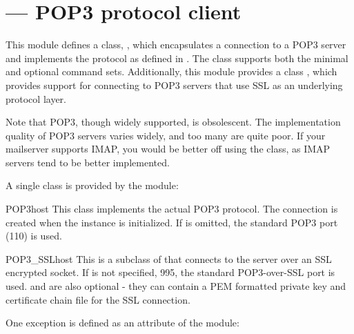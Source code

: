 \section{ ---
         POP3 protocol client}




This module defines a class, , which encapsulates a
connection to a POP3 server and implements the protocol as defined in
.  The  class supports both the minimal and
optional command sets. Additionally, this module provides a class
, which provides support for connecting to POP3
servers that use SSL as an underlying protocol layer.


Note that POP3, though widely supported, is obsolescent.  The
implementation quality of POP3 servers varies widely, and too many are
quite poor. If your mailserver supports IMAP, you would be better off
using the  class, as IMAP
servers tend to be better implemented.

A single class is provided by the  module:

\begin{classdesc}{POP3}{host}
This class implements the actual POP3 protocol.  The connection is
created when the instance is initialized.
If  is omitted, the standard POP3 port (110) is used.
\end{classdesc}

\begin{classdesc}{POP3_SSL}{host}
This is a subclass of  that connects to the server over an
SSL encrypted socket.  If  is not specified, 995, the
standard POP3-over-SSL port is used.   and 
are also optional - they can contain a PEM formatted private key and
certificate chain file for the SSL connection.

\end{classdesc}

One exception is defined as an attribute of the  module:

